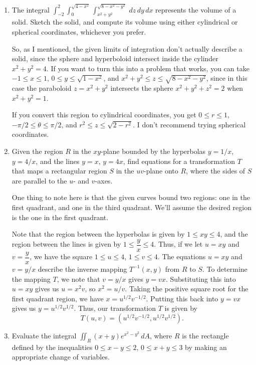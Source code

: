 \documentclass[letterpaper,12pt]{article}
\newcommand{\di}{\displaystyle}
\begin{document}
\begin{enumerate}

 \item The integral $\di \int_{-2}^2\int_0^{\sqrt{4-x^2}}\int_{x^2+y^2}^{\sqrt{8-x^2-y^2}}\,dz\,dy\,dx$ represents the volume of a solid. Sketch the solid, and compute its volume using either cylindrical or spherical coordinates, whichever you prefer.


So, as I mentioned, the given limits of integration don't actually describe a solid, since the sphere and hyperboloid intersect inside the cylinder $x^2+y^2=4$. If you want to turn this into a problem that works, you can take $-1\leq x\leq 1$, $0\leq y\leq \sqrt{1-x^2}$, and $x^2+y^2\leq z\leq \sqrt{8-x^2-y^2}$, since in this case the paraboloid $z=x^2+y^2$ intersects the sphere $x^2+y^2+z^2=2$ when $x^2+y^2=1$.

If you convert this region to cylindrical coordinates, you get $0\leq r\leq 1$, $-\pi/2\leq \theta\leq \pi/2$, and $r^2\leq z\leq \sqrt{2-r^2}$. I don't recommend trying spherical coordinates.

 \item  Given the region $R$ in the $xy$-plane bounded by the hyperbolas $y=1/x$, $y=4/x$, and the lines $y=x$, $y=4x$, find equations for a transformation $T$ that maps a rectangular region $S$ in the $uv$-plane onto $R$, where the sides of $S$ are parallel to the $u$- and $v$-axes.

\bigskip

One thing to note here is that the given curves bound two regions: one in the first quadrant, and one in the third quadrant. We'll assume the desired region is the one in the first quadrant.

Note that the region between the hyperbolas is given by $1\leq xy\leq 4$, and the region between the lines is given by $1\leq \dfrac{y}{x}\leq 4$. Thus, if we let $u=xy$ and $v=\dfrac{y}{x}$, we have the square $1\leq u\leq 4$, $1\leq v\leq 4$. The equations $u=xy$ and $v=y/x$ describe the inverse mapping $T^{-1}(x,y)$ from $R$ to $S$. To determine the mapping $T$, we note that $v=y/x$ gives $y=vx$. Substituting this into $u=xy$ gives us $u=x^2v$, so $x^2=u/v$. Taking the positive square root for the first quadrant region, we have $x=u^{1/2}v^{-1/2}$. Putting this back into $y=vx$ gives us $y=u^{1/2}v^{1/2}$. Thus, our transformation $T$ is given by
\[
 T(u,v) = (u^{1/2}v^{-1/2}, u^{1/2}v^{1/2}).
\]


\item  Evaluate the integral $\di \iint_R (x+y)e^{x^2-y^2}\,dA$, where $R$ is the rectangle defined by the inequalities $0\leq x-y\leq 2$, $0\leq x+y\leq 3$ by making an appropriate change of variables.


\end{enumerate}
\end{document}

